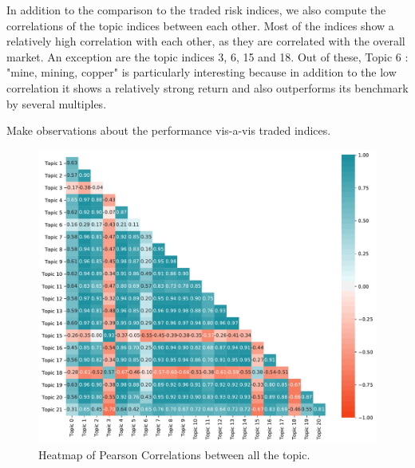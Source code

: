 \documentclass[12pt,journal,letterpaper,oneside,onecolumn]{IEEEtran}
\begin{document}
In addition to the comparison to the traded risk indices, we also compute the correlations of the topic indices between each other.
Most of the indices show a relatively high correlation with each other, as they are correlated with the overall market.
An exception are the topic indices 3, 6, 15 and 18.
Out of these, Topic 6 : "mine, mining, copper" is particularly interesting because in addition to the low correlation it shows a relatively strong return and also outperforms its benchmark by several multiples.


Make observations about the performance vis-a-vis traded indices.

\begin{figure}
    \centering
	\includegraphics[width=0.9\linewidth]{images/heat_map_correlation_diagonal_topics.pdf}
	\caption{Heatmap of Pearson Correlations between all the topic.}
	\label{fig:correlation_dig_topics}       
\end{figure}
\end{document}

